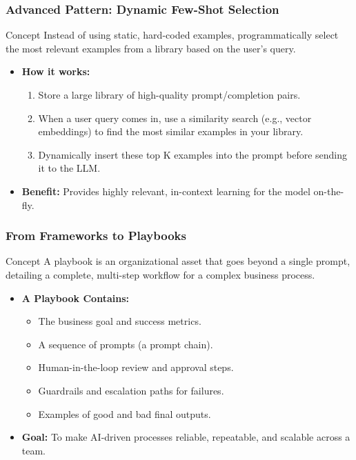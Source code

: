 \documentclass{beamer}
\begin{document}
\begin{frame}
    \frametitle{Advanced Pattern: Dynamic Few-Shot Selection}
    \begin{block}{Concept}
        Instead of using static, hard-coded examples, programmatically select the most relevant examples from a library based on the user's query.
    \end{block}
    \begin{itemize}
        \item \textbf{How it works:}
        \begin{enumerate}
            \item Store a large library of high-quality prompt/completion pairs.
            \item When a user query comes in, use a similarity search (e.g., vector embeddings) to find the most similar examples in your library.
            \item Dynamically insert these top K examples into the prompt before sending it to the LLM.
        \end{enumerate}
        \item \textbf{Benefit:} Provides highly relevant, in-context learning for the model on-the-fly.
    \end{itemize}
\end{frame}

\begin{frame}
    \frametitle{From Frameworks to Playbooks}
    \begin{block}{Concept}
        A playbook is an organizational asset that goes beyond a single prompt, detailing a complete, multi-step workflow for a complex business process.
    \end{block}
    \begin{itemize}
        \item \textbf{A Playbook Contains:}
        \begin{itemize}
            \item The business goal and success metrics.
            \item A sequence of prompts (a prompt chain).
            \item Human-in-the-loop review and approval steps.
            \item Guardrails and escalation paths for failures.
            \item Examples of good and bad final outputs.
        \end{itemize}
        \item \textbf{Goal:} To make AI-driven processes reliable, repeatable, and scalable across a team.
    \end{itemize}
\end{frame}
\end{document}

